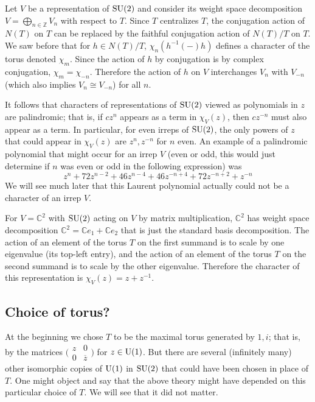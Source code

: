 \documentclass[../../rtnotes.tex]{subfiles}
\begin{document}
Let $V$ be a representation of $\operatorname{SU}(2)$ and consider its weight space decomposition $V = \bigoplus_{n\in\mathbb Z}V_n$ with respect to $T$. Since $T$ centralizes $T$, the conjugation action of $N(T)$ on $T$ can be replaced by the faithful conjugation action of $N(T)/T$ on $T$. We saw before that for $h\in N(T)/T$, $\chi_n(h^{-1}(-)h)$ defines a character of the torus denoted $\chi_m$. Since the action of $h$ by conjugation is by complex conjugation, $\chi_m = \chi_{-n}$. Therefore the action of $h$ on $V$ interchanges $V_n$ with $V_{-n}$ (which also implies $V_n\cong V_{-n}$) for all $n$.

It follows that characters of representations of $\operatorname{SU}(2)$ viewed as polynomials in $z$ are palindromic; that is, if $cz^n$ appears as a term in $\chi_V(z)$, then $cz^{-n}$ must also appear as a term. In particular, for even irreps of $\operatorname{SU}(2)$, the only powers of $z$ that could appear in $\chi_V(z)$ are $z^n,z^{-n}$ for $n$ even. An example of a palindromic polynomial that might occur for an irrep $V$ (even or odd, this would just determine if $n$ was even or odd in the following expression) was 
\[z^n + 72z^{n-2} + 46z^{n-4} + 46z^{-n+4} + 72z^{-n+2} + z^{-n}\]
We will see much later that this Laurent polynomial actually could not be a character of an irrep $V$.

For $V = \mathbb C^2$ with $\operatorname{SU}(2)$ acting on $V$ by matrix multiplication, $\mathbb C^2$ has weight space decomposition $\mathbb C^2 = \mathbb Ce_1 + \mathbb Ce_2$ that is just the standard basis decomposition. The action of an element of the torus $T$ on the first summand is to scale by one eigenvalue (its top-left entry), and the action of an element of the torus $T$ on the second summand is to scale by the other eigenvalue. Therefore the character of this representation is $\chi_V(z) = z+z^{-1}$.

\subsection{Choice of torus?}
At the beginning we chose $T$ to be the maximal torus generated by $1,i$; that is, by the matrices $\bigl(\!\begin{smallmatrix}
    z & 0 \\ 0 & \overline z
\end{smallmatrix}\!\bigr)$ for $z\in\operatorname{U}(1)$. But there are several (infinitely many) other isomorphic copies of $\operatorname{U}(1)$ in $\operatorname{SU}(2)$ that could have been chosen in place of $T$. One might object and say that the above theory might have depended on this particular choice of $T$. We will see that it did not matter. 
\end{document}

